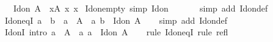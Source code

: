 \begin{isabellebody}
\ \ \ {\isachardoublequoteopen}Id{\isacharunderscore}{\kern0pt}on\ A\ {\isacharequal}{\kern0pt}\ {\isacharparenleft}{\kern0pt}{\isasymUnion}x{\isasymin}A{\isachardot}{\kern0pt}\ {\isacharbraceleft}{\kern0pt}{\isacharparenleft}{\kern0pt}x{\isacharcomma}{\kern0pt}\ x{\isacharparenright}{\kern0pt}{\isacharbraceright}{\kern0pt}{\isacharparenright}{\kern0pt}{\isachardoublequoteclose}\isanewline
\isanewline
{}\isamarkupfalse%
\ Id{\isacharunderscore}{\kern0pt}on{\isacharunderscore}{\kern0pt}empty\ {\isacharbrackleft}{\kern0pt}simp{\isacharbrackright}{\kern0pt}{\isacharcolon}{\kern0pt}\ {\isachardoublequoteopen}Id{\isacharunderscore}{\kern0pt}on\ {\isacharbraceleft}{\kern0pt}{\isacharbraceright}{\kern0pt}\ {\isacharequal}{\kern0pt}\ {\isacharbraceleft}{\kern0pt}{\isacharbraceright}{\kern0pt}{\isachardoublequoteclose}\isanewline
%
\isadelimproof
\ \ %
\endisadelimproof
%
\isatagproof
{}\isamarkupfalse%
\ {\isacharparenleft}{\kern0pt}simp\ add{\isacharcolon}{\kern0pt}\ Id{\isacharunderscore}{\kern0pt}on{\isacharunderscore}{\kern0pt}def{\isacharparenright}{\kern0pt}%
\endisatagproof
{\isafoldproof}%
%
\isadelimproof
\isanewline
%
\endisadelimproof
\isanewline
{}\isamarkupfalse%
\ Id{\isacharunderscore}{\kern0pt}on{\isacharunderscore}{\kern0pt}eqI{\isacharcolon}{\kern0pt}\ {\isachardoublequoteopen}a\ {\isacharequal}{\kern0pt}\ b\ {\isasymLongrightarrow}\ a\ {\isasymin}\ A\ {\isasymLongrightarrow}\ {\isacharparenleft}{\kern0pt}a{\isacharcomma}{\kern0pt}\ b{\isacharparenright}{\kern0pt}\ {\isasymin}\ Id{\isacharunderscore}{\kern0pt}on\ A{\isachardoublequoteclose}\isanewline
%
\isadelimproof
\ \ %
\endisadelimproof
%
\isatagproof
{}\isamarkupfalse%
\ {\isacharparenleft}{\kern0pt}simp\ add{\isacharcolon}{\kern0pt}\ Id{\isacharunderscore}{\kern0pt}on{\isacharunderscore}{\kern0pt}def{\isacharparenright}{\kern0pt}%
\endisatagproof
{\isafoldproof}%
%
\isadelimproof
\isanewline
%
\endisadelimproof
\isanewline
{}\isamarkupfalse%
\ Id{\isacharunderscore}{\kern0pt}onI\ {\isacharbrackleft}{\kern0pt}intro{\isacharbang}{\kern0pt}{\isacharbrackright}{\kern0pt}{\isacharcolon}{\kern0pt}\ {\isachardoublequoteopen}a\ {\isasymin}\ A\ {\isasymLongrightarrow}\ {\isacharparenleft}{\kern0pt}a{\isacharcomma}{\kern0pt}\ a{\isacharparenright}{\kern0pt}\ {\isasymin}\ Id{\isacharunderscore}{\kern0pt}on\ A{\isachardoublequoteclose}\isanewline
%
\isadelimproof
\ \ %
\endisadelimproof
%
\isatagproof
{}\isamarkupfalse%
\ {\isacharparenleft}{\kern0pt}rule\ Id{\isacharunderscore}{\kern0pt}on{\isacharunderscore}{\kern0pt}eqI{\isacharparenright}{\kern0pt}\ {\isacharparenleft}{\kern0pt}rule\ refl{\isacharparenright}{\kern0pt}%

\end{isabellebody}
